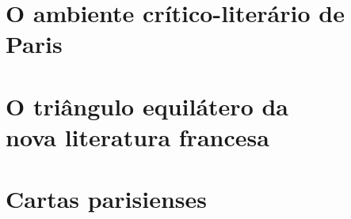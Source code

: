 

\part{O ambiente crítico-literário de Paris}




\part[O triângulo equilátero da nova\\ literatura francesa]{O triângulo equilátero da\\ nova literatura francesa}









\part{Cartas parisienses}

